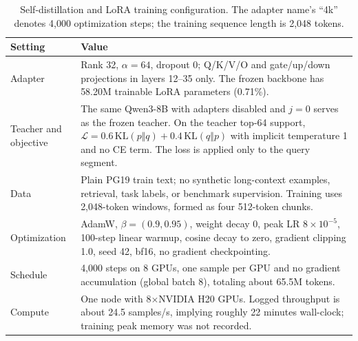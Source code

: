\begin{table}[t]
\vspace{4pt}
\scriptsize
\renewcommand{\arraystretch}{0.92}
\setlength{\tabcolsep}{3pt}
\begin{tabular}{@{}p{}p{}@{}}
\toprule
\textbf{Setting} & \textbf{Value} \\
\midrule
Adapter & Rank 32, $\alpha{=}64$, dropout 0; Q/K/V/O and gate/up/down projections in layers 12--35 only. The frozen backbone has 58.20M trainable LoRA parameters (0.71\%). \\
Teacher and objective & The same Qwen3-8B with adapters disabled and $j{=}0$ serves as the frozen teacher. On the teacher top-64 support, $\mathcal L=0.6\,\mathrm{KL}(p\Vert q)+0.4\,\mathrm{KL}(q\Vert p)$ with implicit temperature 1 and no CE term. The loss is applied only to the query segment. \\
Data & Plain PG19 train text; no synthetic long-context examples, retrieval, task labels, or benchmark supervision. Training uses 2,048-token windows, formed as four 512-token chunks. \\
Optimization & AdamW, $\beta=(0.9,0.95)$, weight decay 0, peak LR $8\times10^{-5}$, 100-step linear warmup, cosine decay to zero, gradient clipping 1.0, seed 42, bf16, no gradient checkpointing. \\
Schedule & 4,000 steps on 8 GPUs, one sample per GPU and no gradient accumulation (global batch 8), totaling about 65.5M tokens. \\
Compute & One node with 8$\times$NVIDIA H20 GPUs. Logged throughput is about 24.5 samples/s, implying roughly 22 minutes wall-clock; training peak memory was not recorded. \\
\bottomrule
\end{tabular}
\caption{Self-distillation and LoRA training configuration. The adapter name's
``4k'' denotes 4,000 optimization steps; the training sequence length is 2,048
tokens.}
\label{tab:repro-train}


\end{table}
